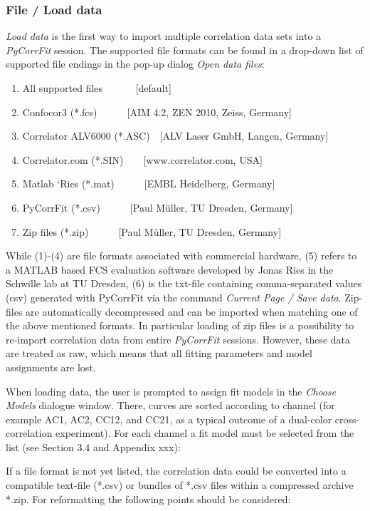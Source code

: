 \subsubsection{File / Load data}

\textit{Load data }is the first way to import multiple correlation data sets into a \textit{PyCorrFit} session. The supported file formats can be found in a drop-down list of supported file endings in the pop-up dialog \textit{Open data files}:


\begin{enumerate}
\item All supported files \ \ \ \ \ \ [default]
\item Confocor3 (*.fcs)\ \ \ \ \ \ [AIM 4.2, ZEN 2010, Zeiss, Germany]
\item Correlator ALV6000 (*.ASC)\ \ [ALV Laser GmbH, Langen, Germany]
\item Correlator.com (*.SIN)\ \ \ \ [www.correlator.com, USA]
\item Matlab ‘Ries (*.mat)\ \ \ \ \ \ [EMBL Heidelberg, Germany]
\item PyCorrFit (*.csv)\ \ \ \ \ \ [Paul Müller, TU Dresden, Germany]
\item Zip files (*.zip)\ \ \ \ \ \ [Paul Müller, TU Dresden, Germany]
\end{enumerate}
While (1)-(4) are file formats associated with commercial hardware, (5) refers to a MATLAB based FCS evaluation software developed by Jonas Ries in the Schwille lab at TU Dresden, (6) is the txt-file containing comma-separated values (csv) generated with PyCorrFit via the command \textit{Current Page / Save data}. Zip-files are automatically decompressed and can be imported when matching one of the above mentioned formats. In particular loading of zip files is a possibility to re-import correlation data from entire \textit{PyCorrFit} sessions. However, these data are treated as raw, which means that all fitting parameters and model assignments are lost.

When loading data, the user is prompted to assign fit models in the \textit{Choose }\textit{Models} dialogue window. There, curves are sorted according to channel (for example AC1, AC2, CC12, and CC21, as a typical outcome of a dual-color cross-correlation experiment). For each channel a fit model must be selected from the list (see Section 3.4 and Appendix xxx):

If a file format is not yet listed, the correlation data could be converted into a compatible text-file (*.csv) or bundles of *.csv files within a compressed archive *.zip. For reformatting the following points should be considered:


